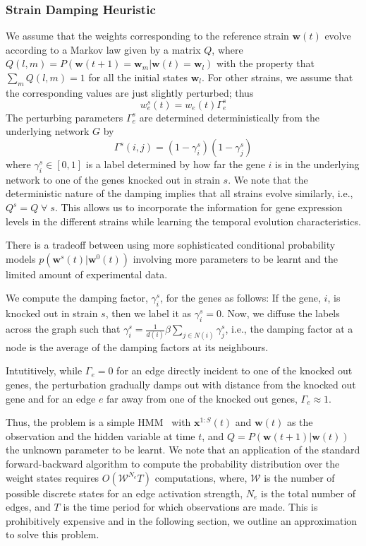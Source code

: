 \documentclass{bioinfo}
\begin{document}
\begin{methods}
\subsubsection{Strain Damping Heuristic } 
We assume that the weights corresponding to the reference strain
$\mathbf{w}(t)$ evolve according to a Markov law given by a matrix $Q$,
where $Q(l, m) = P(\mathbf{w}(t+1) = \mathbf{w}_{m} | {\mathbf w}(t)
= \mathbf{w}_{l})$ with the property that $\sum_{m} Q(l, m) = 1$ for
all the initial states $\mathbf{w}_{l}$. For other strains, we assume
that the corresponding values are just slightly perturbed; thus
\begin{equation}
  \label{eq:damping}
 w^s_e(t) = w_e(t) \Gamma^s_e
\end{equation}
The perturbing parameters $\Gamma^s_e$ are determined
deterministically from the underlying network $G$ by
\begin{equation}
  \label{eq:edge-damping}
\Gamma^s(i,j) = (1 - \gamma^s_i)(1 - \gamma^s_j)  
\end{equation}
where $\gamma^s_i \in [0,1]$ is a label determined by how far the gene
$i$ is in the underlying network to one of the genes knocked out in
strain $s$. We note that the deterministic nature of the damping
implies that all strains evolve similarly, i.e., $Q^{s} = Q\;
\forall \; s$. This allows us to incorporate the information for gene
expression levels in the different strains while learning the temporal
evolution characteristics. 

There is a tradeoff between using more sophisticated conditional
probability models $p(\mathbf{w}^{s}(t) |\mathbf{w}^{0}(t))$ involving more
parameters to be learnt and the limited amount of experimental
data. 

We compute the damping factor, $\gamma^s_i$, for the genes
as follows: If the gene, $i$, is knocked out in strain $s$, then we
label it as $\gamma^s_i=0$. Now, we diffuse the labels across the
graph  such that $\gamma^{s}_i = \frac{1}{d(i)} \beta
\sum_{j\in N(i)} \gamma_j^s$, i.e., the damping factor at a node is
the average of the damping factors at its neighbours.    

 Intutitively, while $\Gamma_e = 0$ for an edge 
directly incident to one of the knocked out genes, the perturbation
gradually damps out with distance from the knocked out gene and for
an edge $e$ far away from one of the knocked out genes, $\Gamma_e
\approx 1$.

Thus, the problem is a simple HMM~\cite{Rabiner89hmm} with
$\mathbf{x}^{1:S}(t)$ and $\mathbf{w}(t)$ as the observation and  the
hidden variable at time $t$, and $Q=P(\mathbf{w}(t+1)| \mathbf{w}(t))$
the unknown parameter to be learnt. 
We note that an application of the standard forward-backward algorithm
to compute the probability distribution over the weight states
requires $O({\mathcal W}^{N_{e}}T)$ computations, where, ${\mathcal
  W}$ is the number of possible discrete states for an edge activation
strength, $N_{e}$ is the total number of edges, and $T$ is the time
period for which observations are made.  This is prohibitively
expensive and in the following section, we outline an approximation to
solve this problem.


\end{methods}
\end{document}
